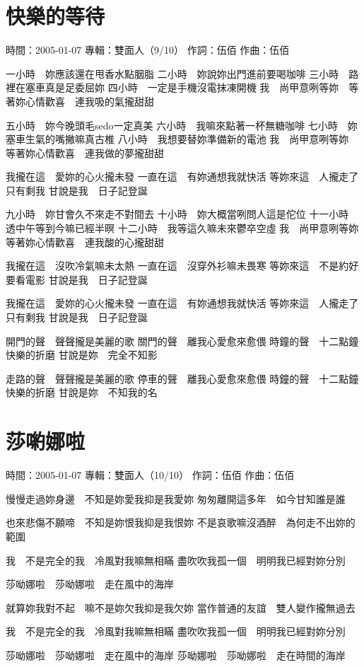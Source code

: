 \documentclass[UTF8,a4paper,oneside,twocolumn,12pt]{ctexbook}
\newcommand{\infopair}[2]{\textbullet #1：#2}
\newcommand{\zc}[1][伍佰]{\infopair{作詞}{#1}}
\newcommand{\zq}[1][伍佰]{\infopair{作曲}{#1}}
\newcommand{\zj}[1]{\infopair{專輯}{#1}}
\newcommand{\sj}[1]{\infopair{時間}{#1}}
\newenvironment{info}{\begin{flushleft}\kaishu
	}
	{\end{flushleft}\normalsize\yahei\par}
\newenvironment{lyric}{
	}
{}
\begin{document}
\section{快樂的等待}
\begin{info}
	\sj{2005-01-07}
	\zj{雙面人（9/10）}
	\zc
	\zq
\end{info}
\begin{lyric}
	一小時　妳應該還在甩香水點胭脂
	二小時　妳說妳出門進前要喝咖啡
	三小時　路裡在塞車真是足委屈妳
	四小時　一定是手機沒電抹凍開機
	我　尚甲意咧等妳　等著妳心情歡喜　連我吸的氣攏甜甜

	五小時　妳今晚頭毛sedo一定真美
	六小時　我嘛來點著一杯無糖咖啡
	七小時　妳塞車生氣的嘴撇嘛真古椎
	八小時　我想要替妳準備新的電池
	我　尚甲意咧等妳　等著妳心情歡喜　連我做的夢攏甜甜

	我攏在這　愛妳的心火攏未發
	一直在這　有妳通想我就快活
	等妳來這　人攏走了只有剩我
	甘說是我　日子記登誕

	九小時　妳甘會久不來走不對間去
	十小時　妳大概當咧問人這是佗位
	十一小時　透中午等到今嘛已經半暝
	十二小時　我等這久嘛未來鬱卒空虛
	我　尚甲意咧等妳　等著妳心情歡喜　連我酸的心攏甜甜

	我攏在這　沒吹冷氣嘛未太熱
	一直在這　沒穿外衫嘛未畏寒
	等妳來這　不是約好要看電影
	甘說是我　日子記登誕

	我攏在這　愛妳的心火攏未發
	一直在這　有妳通想我就快活
	等妳來這　人攏走了只有剩我
	甘說是我　日子記登誕

	開門的聲　聲聲攏是美麗的歌
	關門的聲　離我心愛愈來愈偎
	時鐘的聲　十二點鐘快樂的折磨
	甘說是妳　完全不知影

	走路的聲　聲聲攏是美麗的歌
	停車的聲　離我心愛愈來愈偎
	時鐘的聲　十二點鐘快樂的折磨
	甘說是妳　不知我的名
\end{lyric}

\section{莎喲娜啦}
\begin{info}
	\sj{2005-01-07}
	\zj{雙面人（10/10）}
	\zc
	\zq
\end{info}
\begin{lyric}
	慢慢走過妳身邊　不知是妳愛我抑是我愛妳
	匆匆離開這多年　如今甘知誰是誰

	也來悲傷不願啼　不知是妳恨我抑是我恨妳
	不是哀歌嘛沒酒醉　為何走不出妳的範圍

	我　不是完全的我　冷風對我嘛無相瞞
	盡吹吹我孤一個　明明我已經對妳分別

	莎呦娜啦　莎呦娜啦　走在風中的海岸

	就算妳我對不起　嘛不是妳欠我抑是我欠妳
	當作普通的友誼　雙人變作攏無過去

	我　不是完全的我　冷風對我嘛無相瞞
	盡吹吹我孤一個　明明我已經對妳分別

	莎呦娜啦　莎呦娜啦　走在風中的海岸
	莎呦娜啦　莎呦娜啦　走在時間的海岸
\end{lyric}
\end{document}

